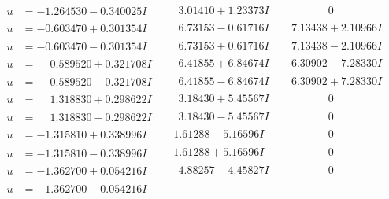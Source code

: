 \documentclass[1p]{elsarticle_modified}
\theoremstyle{definition}
\begin{document}
$$\begin{array}{c|c|c}
 \hline 
\begin{aligned}
u &= -1.264530 - 0.340025 I\end{aligned}
 & \phantom{-}3.01410 + 1.23373 I & \phantom{-0.000000 } 0 \\ \hline\begin{aligned}
u &= -0.603470 + 0.301354 I\end{aligned}
 & \phantom{-}6.73153 - 0.61716 I & \phantom{-}7.13438 + 2.10966 I \\ \hline\begin{aligned}
u &= -0.603470 - 0.301354 I\end{aligned}
 & \phantom{-}6.73153 + 0.61716 I & \phantom{-}7.13438 - 2.10966 I \\ \hline\begin{aligned}
u &= \phantom{-}0.589520 + 0.321708 I\end{aligned}
 & \phantom{-}6.41855 + 6.84674 I & \phantom{-}6.30902 - 7.28330 I \\ \hline\begin{aligned}
u &= \phantom{-}0.589520 - 0.321708 I\end{aligned}
 & \phantom{-}6.41855 - 6.84674 I & \phantom{-}6.30902 + 7.28330 I \\ \hline\begin{aligned}
u &= \phantom{-}1.318830 + 0.298622 I\end{aligned}
 & \phantom{-}3.18430 + 5.45567 I & \phantom{-0.000000 } 0 \\ \hline\begin{aligned}
u &= \phantom{-}1.318830 - 0.298622 I\end{aligned}
 & \phantom{-}3.18430 - 5.45567 I & \phantom{-0.000000 } 0 \\ \hline\begin{aligned}
u &= -1.315810 + 0.338996 I\end{aligned}
 & -1.61288 - 5.16596 I & \phantom{-0.000000 } 0 \\ \hline\begin{aligned}
u &= -1.315810 - 0.338996 I\end{aligned}
 & -1.61288 + 5.16596 I & \phantom{-0.000000 } 0 \\ \hline\begin{aligned}
u &= -1.362700 + 0.054216 I\end{aligned}
 & \phantom{-}4.88257 - 4.45827 I & \phantom{-0.000000 } 0 \\ \hline\begin{aligned}
u &= -1.362700 - 0.054216 I\end{aligned}

\end{array}$$
\end{document}
